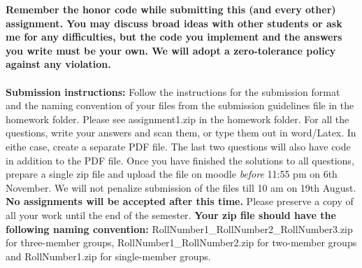 \documentclass[11pt]{article}
\begin{document}
\maketitle

\textbf{Remember the honor code while submitting this (and every other) assignment. You may discuss broad ideas with other students or ask me for any difficulties, but the code you implement and the answers you write must be your own. We will adopt a \textbf{zero-tolerance policy} against any violation.}
\\
\\
\textbf{Submission instructions:} Follow the instructions for the submission format and the naming convention of your files from the submission guidelines file in the homework folder. Please see \textsf{assignment1.zip} in the homework folder. For all the questions, write your answers and scan them, or type them out in word/Latex. In eithe case, create a separate PDF file. The last two questions will also have code in addition to the PDF file. Once you have finished the solutions to all questions, prepare a single zip file and upload the file on moodle \emph{before} 11:55 pm on 6th November.  We will not penalize submission of the files till 10 am on 19th August. \textbf{No assignments will be accepted after this time.} Please preserve a copy of all your work until the end of the semester.  \textbf{Your zip file should have the following naming convention:} RollNumber1\_RollNumber2\_RollNumber3.zip for three-member groups, RollNumber1\_RollNumber2.zip for two-member groups and RollNumber1.zip for single-member groups.
\end{document}
